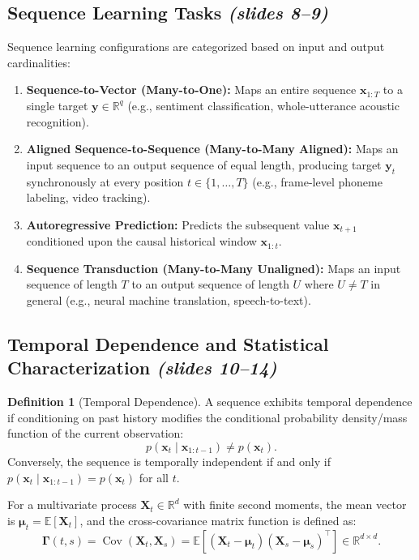 \documentclass[11pt,a4paper]{article}
\theoremstyle{definition}
\newtheorem{definition}{Definition}[section]
\theoremstyle{plain}
\begin{document}
\subsection{Sequence Learning Tasks \emph{(slides 8--9)}}
Sequence learning configurations are categorized based on input and output cardinalities:
\begin{enumerate}
    \item \textbf{Sequence-to-Vector (Many-to-One):} Maps an entire sequence $\mathbf{x}_{1:T}$ to a single target $\mathbf{y} \in \mathbb{R}^q$ (e.g., sentiment classification, whole-utterance acoustic recognition).
    \item \textbf{Aligned Sequence-to-Sequence (Many-to-Many Aligned):} Maps an input sequence to an output sequence of equal length, producing target $\mathbf{y}_t$ synchronously at every position $t \in \{1, \dots, T\}$ (e.g., frame-level phoneme labeling, video tracking).
    \item \textbf{Autoregressive Prediction:} Predicts the subsequent value $\mathbf{x}_{t+1}$ conditioned upon the causal historical window $\mathbf{x}_{1:t}$.
    \item \textbf{Sequence Transduction (Many-to-Many Unaligned):} Maps an input sequence of length $T$ to an output sequence of length $U$ where $U \neq T$ in general (e.g., neural machine translation, speech-to-text).
\end{enumerate}

\subsection{Temporal Dependence and Statistical Characterization \emph{(slides 10--14)}}

\begin{definition}[Temporal Dependence]
A sequence exhibits temporal dependence if conditioning on past history modifies the conditional probability density/mass function of the current observation:
\begin{equation}
    p(\mathbf{x}_t \mid \mathbf{x}_{1:t-1}) \neq p(\mathbf{x}_t).
\end{equation}
Conversely, the sequence is temporally independent if and only if $p(\mathbf{x}_t \mid \mathbf{x}_{1:t-1}) = p(\mathbf{x}_t)$ for all $t$.
\end{definition}

For a multivariate process $\mathbf{X}_t \in \mathbb{R}^d$ with finite second moments, the mean vector is $\boldsymbol{\mu}_t = \mathbb{E}[\mathbf{X}_t]$, and the cross-covariance matrix function is defined as:
\begin{equation}
    \boldsymbol{\Gamma}(t, s) = \operatorname{Cov}(\mathbf{X}_t, \mathbf{X}_s) = \mathbb{E}\left[(\mathbf{X}_t - \boldsymbol{\mu}_t)(\mathbf{X}_s - \boldsymbol{\mu}_s)^\top\right] \in \mathbb{R}^{d \times d}.
\end{equation}
\end{document}
